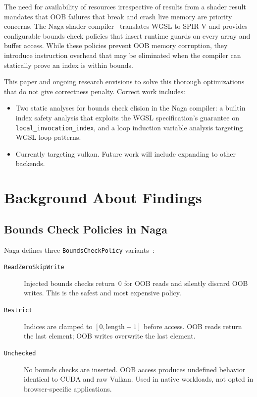 \documentclass[11pt,a4paper]{article}
\begin{document}
The need for availability of resources irrespective of results from a shader result mandates that OOB failures that break and crash live memory are priority concerns.
The Naga shader compiler~\cite{naga_repo} translates WGSL to SPIR-V and
provides configurable bounds check policies that insert runtime guards on
every array and buffer access. While these policies prevent OOB memory
corruption, they introduce instruction overhead that may be eliminated when
the compiler can statically prove an index is within bounds.

This paper and ongoing research envisions to solve this thorough optimizations that do not give correctness penalty. Correct work includes:
\begin{itemize}
  \item Two static analyses for bounds check elision in the Naga compiler:
  a builtin index safety analysis that exploits the WGSL specification's
  guarantee on \texttt{local\_invocation\_index}, and a loop induction
  variable analysis targeting WGSL loop patterns. 
  \item Currently targeting vulkan. Future work will include expanding to other backends.

\end{itemize}

\section{Background About Findings}
\label{sec:background}

\subsection{Bounds Check Policies in Naga}

Naga defines three \texttt{BoundsCheckPolicy} variants~\cite{naga_bounds_check}:

\begin{description}
  \item[\texttt{ReadZeroSkipWrite}] Injected bounds checks return~0 for OOB
  reads and silently discard OOB writes. This is the safest and most expensive
  policy.
  \item[\texttt{Restrict}] Indices are clamped to $[0, \text{length}-1]$
  before access. OOB reads return the last element; OOB writes overwrite the
  last element.
  \item[\texttt{Unchecked}] No bounds checks are inserted. OOB access produces
  undefined behavior identical to CUDA and raw Vulkan. Used in native workloads, not  opted in browser-specific applications.
\end{description}
\end{document}
